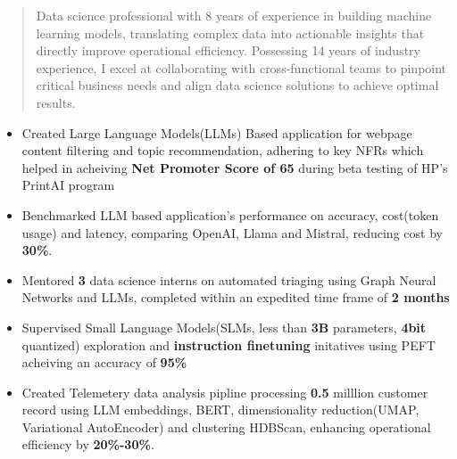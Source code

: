 \documentclass[10pt,a4paper,ragged2e,withhyper]{altacv}
\author{Gaurav Sood}
\date{\today}
\title{}
\begin{document}

\makecvheader

\begin{paracol}{1}
 \begin{quote}
Data science professional with 8 years of experience in building machine learning models, translating complex data into actionable insights that directly improve operational efficiency. Possessing 14 years of industry experience, I excel at collaborating with cross-functional teams to pinpoint critical business needs and align data science solutions to achieve optimal results.
 \end{quote}
\label{sec:org1dd1a38}



\divider

\divider


\label{sec:orgc16c2a2}

\begin{itemize}
\item Created Large Language Models(LLMs) Based application for webpage content
filtering and topic recommendation, adhering to key NFRs which helped in
acheiving \textbf{\textbf{Net Promoter Score of 65}} during beta testing of HP's PrintAI
program
\item Benchmarked LLM based application's performance on accuracy, cost(token usage)
and latency, comparing OpenAI, Llama and Mistral, reducing cost by \textbf{\textbf{30\%}}.
\item Mentored \textbf{\textbf{3}} data science interns on automated triaging using Graph Neural
Networks and LLMs, completed within an expedited time frame of \textbf{\textbf{2 months}}
\item Supervised Small Language Models(SLMs, less than \textbf{\textbf{3B}} parameters, \textbf{\textbf{4bit}}
quantized) exploration and \textbf{\textbf{instruction finetuning}}
initatives using PEFT acheiving an accuracy of \textbf{\textbf{95\%}}
\item Created Telemetery data analysis pipline processing \textbf{\textbf{0.5}} milllion customer
record using LLM embeddings, BERT, dimensionality reduction(UMAP, Variational
AutoEncoder) and clustering HDBScan, enhancing operational efficiency by \textbf{\textbf{20\%-30\%}}.
\end{itemize}


\end{paracol}
\end{document}
